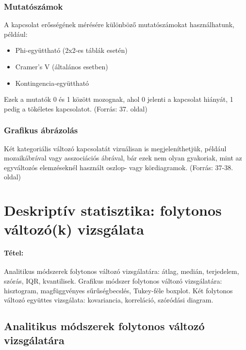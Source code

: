\documentclass[a4paper,12pt]{article}
\begin{document}
    \subsubsection{Mutatószámok}

    A kapcsolat erősségének mérésére különböző mutatószámokat használhatunk, például:

    \begin{itemize}
        \item Phi-együttható (2x2-es táblák esetén)
        \item Cramer's V (általános esetben)
        \item Kontingencia-együttható
    \end{itemize}

    Ezek a mutatók 0 és 1 között mozognak, ahol 0 jelenti a kapcsolat hiányát, 1 pedig a tökéletes kapcsolatot.
    (Forrás: 37. oldal)

    \subsubsection{Grafikus ábrázolás}

    Két kategoriális változó kapcsolatát vizuálisan is megjeleníthetjük, például mozaikábrával vagy asszociációs ábrával, bár ezek nem olyan gyakoriak, mint az egyváltozós elemzéseknél használt oszlop- vagy kördiagramok.
    (Forrás: 37-38. oldal)

    \newpage


    \section{Deskriptív statisztika: folytonos változó(k) vizsgálata}

    \paragraph{Tétel:} Analitikus módszerek folytonos változó vizsgálatára: átlag, medián, terjedelem, szórás, IQR,
    kvantilisek. Grafikus módszer folytonos változó vizsgálatára: hisztogram, magfüggvényes
    sűrűségbecslés, Tukey-féle boxplot. Két folytonos változó együttes vizsgálata: kovariancia,
    korreláció, szóródási diagram.

    \subsection{Analitikus módszerek folytonos változó vizsgálatára}
\end{document}
